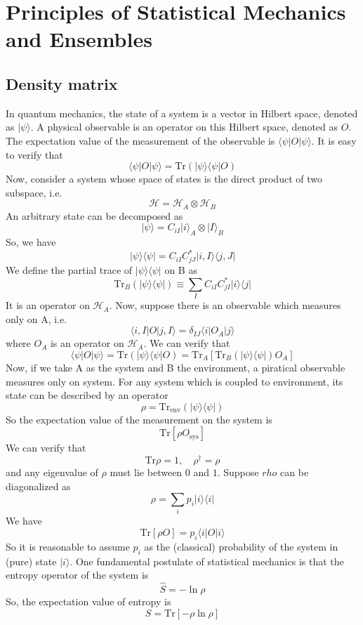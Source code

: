 \documentclass[cyan]{elegantnote}
\begin{document}
\chapter{Principles of Statistical Mechanics and Ensembles}
\section{Density matrix}
In quantum mechanics, the state of a system is a vector in Hilbert space, denoted as $|\psi\rangle$. A physical observable is an operator on this Hilbert space, denoted as $O$. The expectation value of the measurement of the observable is $\langle \psi | O | \psi \rangle$. It is easy to verify that
\[\langle \psi | O | \psi \rangle = \mathrm{Tr}(| \psi \rangle \langle \psi | O)\]
Now, consider a system whose space of states is the direct product of two subspace, i.e.
\[\mathcal{H} = \mathcal{H}_A \otimes \mathcal{H}_B\]
An arbitrary state can be decomposed as
\[|\psi\rangle = C_{iI}|i\rangle_A \otimes |I\rangle_B\]
So, we have
\[| \psi \rangle \langle \psi | = C_{iI}C^*_{jJ} |i,I\rangle \langle j,J |\]
We define the partial trace of $| \psi \rangle \langle \psi |$ on B as
\[\mathrm{Tr}_B (| \psi \rangle \langle \psi |) \equiv \sum_{I} C_{iI}C^*_{jI} |i\rangle \langle j |\]
It is an operator on $\mathcal{H}_A$. 
Now, suppose there is an observable which measures only on A, i.e.
\[\langle i,I | O | j,I \rangle = \delta_{IJ} \langle i | O_A | j \rangle\]
where $O_A$ is an operator on $\mathcal{H}_A$. We can verify that
\[\langle \psi | O | \psi \rangle = \mathrm{Tr}(| \psi \rangle \langle \psi | O) = \mathrm{Tr}_A \left[\mathrm{Tr}_B (| \psi \rangle \langle \psi |) O_A   \right]\]
Now, if we take A as the system and B the environment, a piratical observable measures only on system. For any system which is coupled to environment, its state can be described by an operator
\[\rho = \mathrm{Tr}_{\mathrm{env}} (| \psi \rangle \langle \psi |)\]
So the expectation value of the measurement on the system is
\[\mathrm{Tr}[\rho O_{\mathrm{sys}}]\]
We can verify that
\[\mathrm{Tr}\rho = 1 ,\quad \rho^{\dagger} = \rho\]
and any eigenvalue of $\rho$ must lie between $0$ and $1$. 
Suppose $rho$ can be diagonalized as
\[\rho = \sum_i p_i |i\rangle\langle i |\]
We have
\[\mathrm{Tr}[\rho O] = p_i \langle i | O | i \rangle\]
So it is reasonable to assume $p_i$ as the (classical) probability of the system in (pure) state $|i\rangle$.
One fundamental postulate of statistical mechanics is that the entropy operator of the system is
\[\hat{S} = -\ln \rho\]
So, the expectation value of entropy is
\[S = \mathrm{Tr}[-\rho\ln\rho]\]
\end{document}
